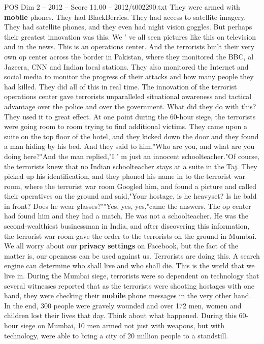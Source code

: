 \begin{textsample}{POS Dim 2 – 2012 – Score 11.00 – 2012/t002290.txt}
They were armed with \textbf{mobile} phones.
They had BlackBerries.
They had access to satellite imagery.
They had satellite phones, and they even had night vision goggles.
But perhaps their greatest innovation was this.
We ' ve all seen pictures like this on television and in the news.
This is an operations center.
And the terrorists built their very own op center across the border in Pakistan, where they monitored the BBC, al Jazeera, CNN and Indian local stations.
They also monitored the Internet and social media to monitor the progress of their attacks and how many people they had killed.
They did all of this in real time.
The innovation of the terrorist operations center gave terrorists unparalleled situational awareness and tactical advantage over the police and over the government.
What did they do with this?
They used it to great effect.
At one point during the 60-hour siege, the terrorists were going room to room trying to find additional victims.
They came upon a suite on the top floor of the hotel, and they kicked down the door and they found a man hiding by his bed.
And they said to him,"Who are you, and what are you doing here?"And the man replied,"I ' m just an innocent schoolteacher."Of course, the terrorists knew that no Indian schoolteacher stays at a suite in the Taj.
They picked up his identification, and they phoned his name in to the terrorist war room, where the terrorist war room Googled him, and found a picture and called their operatives on the ground and said,"Your hostage, is he heavyset?
Is he bald in front?
Does he wear glasses?""Yes, yes, yes,"came the answers.
The op center had found him and they had a match.
He was not a schoolteacher.
He was the second-wealthiest businessman in India, and after discovering this information, the terrorist war room gave the order to the terrorists on the ground in Mumbai.
We all worry about our \textbf{privacy} \textbf{settings} on Facebook, but the fact of the matter is, our openness can be used against us.
Terrorists are doing this.
A search engine can determine who shall live and who shall die.
This is the world that we live in.
During the Mumbai siege, terrorists were so dependent on technology that several witnesses reported that as the terrorists were shooting hostages with one hand, they were checking their \textbf{mobile} phone messages in the very other hand.
In the end, 300 people were gravely wounded and over 172 men, women and children lost their lives that day.
Think about what happened.
During this 60-hour siege on Mumbai, 10 men armed not just with weapons, but with technology, were able to bring a city of 20 million people to a standstill.

\end{textsample}
